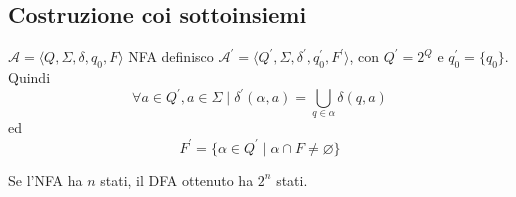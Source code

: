 \documentclass[12pt]{report}
\begin{document}
\subsection{Costruzione coi sottoinsiemi}
\begin{center}
\end{center}
$\mathcal{A} = \langle Q, \Sigma, \delta, q_0, F \rangle$ NFA definisco $\mathcal{A}^\prime = \langle Q^\prime, \Sigma, \delta^\prime, q_0^\prime, F^\prime \rangle$, con $Q^\prime = 2^Q$ e $q_0^\prime = \{ q_0 \}$.
% 
Quindi
$$\forall a \in Q^\prime, a \in \Sigma \mid \delta^\prime(\alpha, a) = \bigcup_{q \in \alpha} \delta(q, a) $$
ed
$$ F^\prime = \{ \alpha \in Q^\prime \mid \alpha \cap F \neq \varnothing\} $$

Se l'NFA ha $n$ stati, il DFA ottenuto ha $2^n$ stati.
\end{document}
